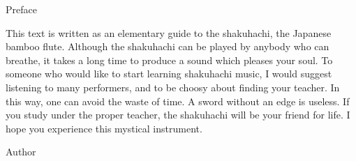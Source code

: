 ﻿Preface

This text is written as an elementary guide to the shakuhachi, the Japanese 
bamboo flute. 
Although the shakuhachi can be played by anybody who can breathe, it takes a long time to produce a sound which pleases your soul.
To someone who would like to start learning shakuhachi music, I would suggest
listening to many performers, and to be choosy about finding your teacher.
In this way, one can avoid the waste of time. A sword without an edge is
useless.
If you study under the proper teacher, the shakuhachi will be your friend for
life. 
I hope you experience this mystical instrument.

                      
                                                          Author

